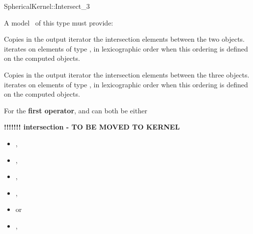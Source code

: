 \begin{ccRefFunctionObjectConcept}{SphericalKernel::Intersect_3}

\ccRefines



A model \ccVar\ of this type must provide:

{Copies in the output iterator the intersection elements between the
two objects.  iterates on
elements of type , in lexicographic order 
when this ordering is defined on the computed objects.}

{Copies in the output iterator the intersection elements between the
three objects.  iterates on
elements of type , in lexicographic order 
when this ordering is defined on the computed objects.}

For the \textbf{first operator},  and  can both 
be either

\textbf{!!!!!!! intersection -  TO BE MOVED TO KERNEL}

\begin{itemize}
\item {} ,
\item {} ,
\item {} ,
\item {} ,
\item {}  or
\item {} ,
\end{itemize} 


\end{ccRefFunctionObjectConcept}
